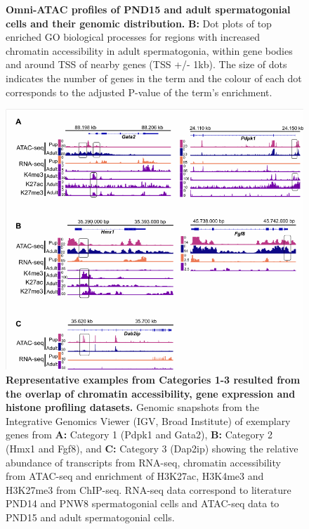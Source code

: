 \documentclass[12pt,twoside]{reedthesis}
\begin{document}
\begin{subfigures}
\begin{figure}[htbp]
{}

\caption[Omni-ATAC profiles of PND15 and adult spermatogonial cells and their genomic distribution]{\textbf{Omni-ATAC profiles of PND15 and adult spermatogonial cells and their genomic distribution.} \newline \textbf{B:} Dot plots of top enriched GO biological processes for regions with increased chromatin accessibility in adult spermatogonia, within gene bodies and around TSS of nearby genes (TSS +/- 1kb). The size of dots indicates the number of genes in the term and the colour of each dot corresponds to the adjusted P-value of the term’s enrichment.}\label{fig:ds2b}
\end{figure}
\end{subfigures}

\begin{figure}[htbp]

{\centering \includegraphics{thesis_files/figure-latex/ds3-1} 

}

\caption[Representative examples from Categories 1-3 resulted from the overlap of chromatin accessibility, gene expression and histone profiling datasets]{\textbf{Representative examples from Categories 1-3 resulted from the overlap of chromatin accessibility, gene expression and histone profiling datasets.} Genomic snapshots from the Integrative Genomics Viewer (IGV, Broad Institute) of exemplary genes from \textbf{A:} Category 1 (Pdpk1 and Gata2), \textbf{B:} Category 2 (Hmx1 and Fgf8), and \textbf{C:} Category 3 (Dap2ip) showing the relative abundance of transcripts from RNA-seq, chromatin accessibility from ATAC-seq and enrichment of H3K27ac, H3K4me3 and H3K27me3 from ChIP-seq. RNA-seq data correspond to literature PND14 and PNW8 spermatogonial cells and ATAC-seq data to PND15 and adult spermatogonial cells.}\label{fig:ds3}
\end{figure}
\end{document}

